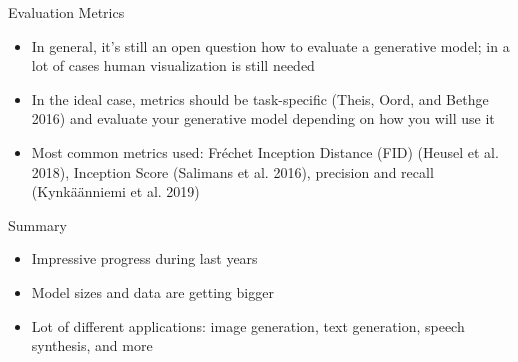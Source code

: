 \begin{frame}{Evaluation Metrics}
\protect\hypertarget{evaluation-metrics}{}

\begin{itemize}
\tightlist
\item
  In general, it's still an open question how to evaluate a generative
  model; in a lot of cases human visualization is still needed
\item
  In the ideal case, metrics should be task-specific (Theis, Oord, and
  Bethge 2016) and evaluate your generative model depending on how you
  will use it
\item
  Most common metrics used: Fréchet Inception Distance (FID) (Heusel et
  al. 2018), Inception Score (Salimans et al. 2016), precision and
  recall (Kynkäänniemi et al. 2019)
\end{itemize}

\end{frame}

\begin{frame}{Summary}
\protect\hypertarget{summary}{}

\begin{itemize}
\tightlist
\item
  Impressive progress during last years
\item
  Model sizes and data are getting bigger
\item
  Lot of different applications: image generation, text generation,
  speech synthesis, and more
\end{itemize}

\end{frame}

